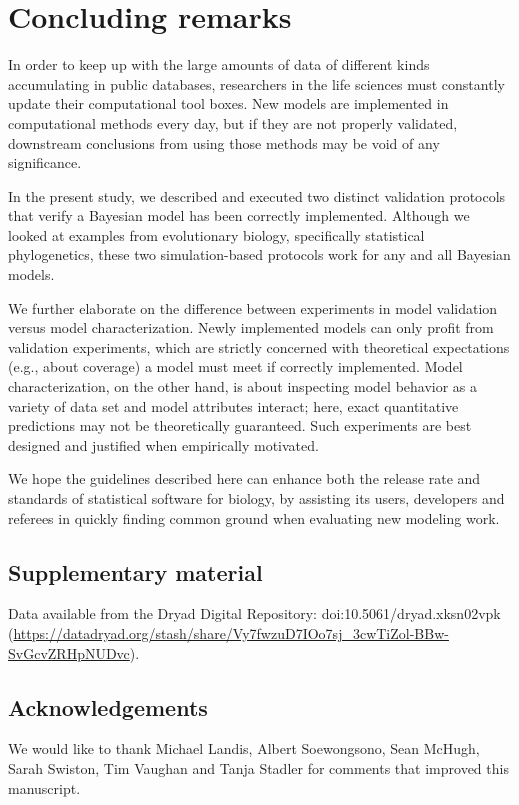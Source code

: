 \documentclass[oneside]{article}
\begin{document}
\section*{Concluding remarks}

In order to keep up with the large amounts of data of different kinds accumulating in public databases, researchers in the life sciences must constantly update their computational tool boxes.
New models are implemented in computational methods every day, but if they are not properly validated, downstream conclusions from using those methods may be void of any significance.

In the present study, we described and executed two distinct validation protocols that verify a Bayesian model has been correctly implemented.
Although we looked at examples from evolutionary biology, specifically statistical phylogenetics, these two simulation-based protocols work for any and all Bayesian models.

We further elaborate on the difference between experiments in model validation versus model characterization.
Newly implemented models can only profit from validation experiments, which are strictly concerned with theoretical expectations (e.g., about coverage) a model must meet if correctly implemented.
Model characterization, on the other hand, is about inspecting model behavior as a variety of data set and model attributes interact; here, exact quantitative predictions may not be theoretically guaranteed.
Such experiments are best designed and justified when empirically motivated.

We hope the guidelines described here can enhance both the release rate and standards of statistical software for biology, by assisting its users, developers and referees in quickly finding common ground when evaluating new modeling work.

\subsection*{Supplementary material}

Data available from the Dryad Digital Repository: doi:10.5061/dryad.xksn02vpk (\url{https://datadryad.org/stash/share/Vy7fwzuD7IOo7sj_3cwTiZol-BBw-SvGcvZRHpNUDvc}).

\subsection*{Acknowledgements}

We would like to thank Michael Landis, Albert Soewongsono, Sean McHugh, Sarah Swiston, Tim Vaughan and Tanja Stadler for comments that improved this manuscript.
\end{document}
